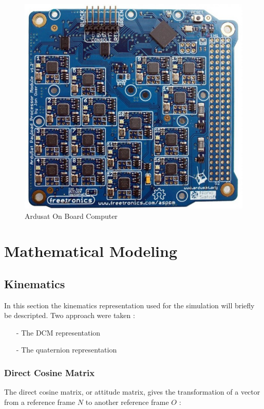 \documentclass[11pt,a4paper]{report}
\begin{document}
\begin{figure}[H]
 	\centering
 	\includegraphics[scale=0.25]{gfx/ardusat.jpg}
    \caption{Ardusat On Board Computer}
\end{figure}

\chapter{Mathematical Modeling}

\section{Kinematics}
In this section the kinematics representation used for the simulation will briefly be descripted. Two approach were taken : 
\begin{itemize}
 \item [-] The DCM representation
 \item [-] The quaternion representation
\end{itemize}

\subsection{Direct Cosine Matrix}
The direct cosine matrix, or attitude matrix, gives the transformation of a vector from a reference frame $N$ to another reference frame $O$ : 
\end{document}
